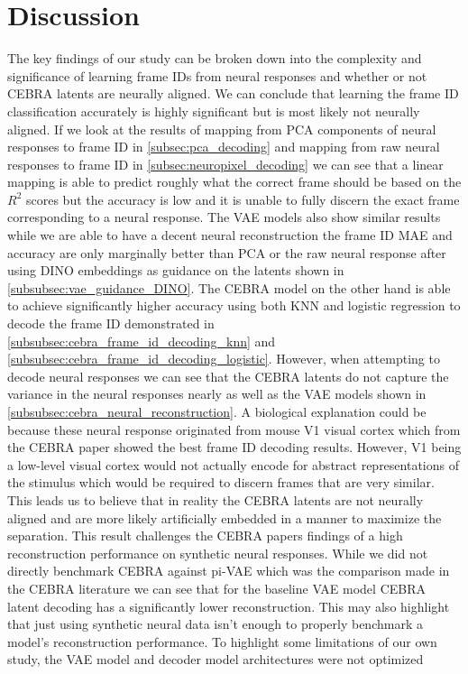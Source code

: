 \documentclass[12pt, letterpaper]{article}
\begin{document}
\section{Discussion}
\label{sec:discussion}
The key findings of our study can be broken down into the complexity and significance of learning frame IDs from neural responses and whether or not CEBRA \cite{schneider2023} latents are neurally aligned. We can conclude that learning the frame ID classification accurately is highly significant but is most likely not neurally aligned. If we look at the results of mapping from PCA components of neural responses to frame ID in \hyperref[subsec:pca_decoding]{\ref{subsec:pca_decoding}} and mapping from raw neural responses to frame ID in \hyperref[subsec:neuropixel_decoding]{\ref{subsec:neuropixel_decoding}} we can see that a linear mapping is able to predict roughly what the correct frame should be based on the $R^2$ scores but the accuracy is low and it is unable to fully discern the exact frame corresponding to a neural response. The VAE models also show similar results while we are able to have a decent neural reconstruction the frame ID MAE and accuracy are only marginally better than PCA or the raw neural response after using DINO embeddings as guidance on the latents shown in \hyperref[subsubsec:vae_guidance_DINO]{\ref{subsubsec:vae_guidance_DINO}}. The CEBRA \cite{schneider2023} model on the other hand is able to achieve significantly higher accuracy using both KNN and logistic regression to decode the frame ID demonstrated in \hyperref[subsubsec:cebra_frame_id_decoding_knn]{\ref{subsubsec:cebra_frame_id_decoding_knn}} and \hyperref[subsubsec:cebra_frame_id_decoding_logistic]{\ref{subsubsec:cebra_frame_id_decoding_logistic}}. However, when attempting to decode neural responses we can see that the CEBRA \cite{schneider2023} latents do not capture the variance in the neural responses nearly as well as the VAE models shown in \hyperref[subsubsec:cebra_neural_reconstruction]{\ref{subsubsec:cebra_neural_reconstruction}}. A biological explanation could be because these neural response originated from mouse V1 visual cortex which from the CEBRA \cite{schneider2023} paper showed the best frame ID decoding results. However, V1 being a low-level visual cortex would not actually encode for abstract representations of the stimulus which would be required to discern frames that are very similar. This leads us to believe that in reality the CEBRA \cite{schneider2023} latents are not neurally aligned and are more likely artificially embedded in a manner to maximize the separation. This result challenges the CEBRA \cite{schneider2023} papers findings of a high reconstruction performance on synthetic neural responses. While we did not directly benchmark CEBRA \cite{schneider2023} against pi-VAE which was the comparison made in the CEBRA \cite{schneider2023} literature we can see that for the baseline VAE model CEBRA \cite{schneider2023} latent decoding has a significantly lower reconstruction. This may also highlight that just using synthetic neural data isn't enough to properly benchmark a model's reconstruction performance. To highlight some limitations of our own study, the VAE model and decoder model architectures were not optimized 
\end{document}
